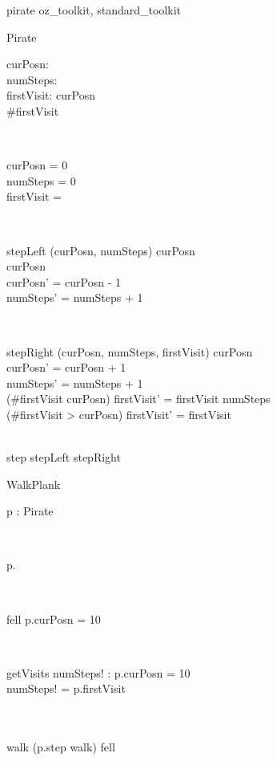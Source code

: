 \documentclass[11pt,a4paper]{article}
\begin{document}
\begin{zsection}
  \SECTION pirate \parents oz\_toolkit, standard\_toolkit
\end{zsection}

\begin{class}{Pirate}
\also
	\begin{state}
		curPosn: \nat \\
		numSteps: \nat \\
		firstVisit: \seq \nat
	\where
		curPosn  \\
		\#firstVisit 
	\end{state} \\
	\begin{init}
		curPosn = 0 \\
		numSteps = 0 \\
		firstVisit = \langle \rangle
	\end{init} \\
	\begin{op}{stepLeft}
		\Delta (curPosn, numSteps)
	\where	
	        curPosn  \\
		curPosn \neq 10 \\
		curPosn' = curPosn - 1 \\
		numSteps' = numSteps + 1 \\
	\end{op} \\
	\begin{op}{stepRight}
		\Delta (curPosn, numSteps, firstVisit)
	\where
	        curPosn  \\
        	curPosn' = curPosn + 1 \\
	        numSteps' = numSteps + 1 \\
		(\#firstVisit \leq curPosn) \implies firstVisit' = firstVisit \cat
			\langle numSteps \rangle \\
		(\#firstVisit > curPosn) \implies firstVisit' = firstVisit
	\end{op} \\
	step \sdef stepLeft \gch stepRight
	\end{class}

\begin{class}{WalkPlank}
\also
        \begin{state}
                p : Pirate
        \end{state} \\
	\begin{init}
		p.\Init
	\end{init}\\
	\begin{op}{fell}
        \where
		p.curPosn = 10
	\end{op} \\
	\begin{op}{getVisits}
		numSteps! : \seq \nat
	\where
		p.curPosn = 10\\
		numSteps! = p.firstVisit
	\end{op} \\
	\\
        walk \sdef (p.step \semi walk) \gch fell
\end{class}
\end{document}
